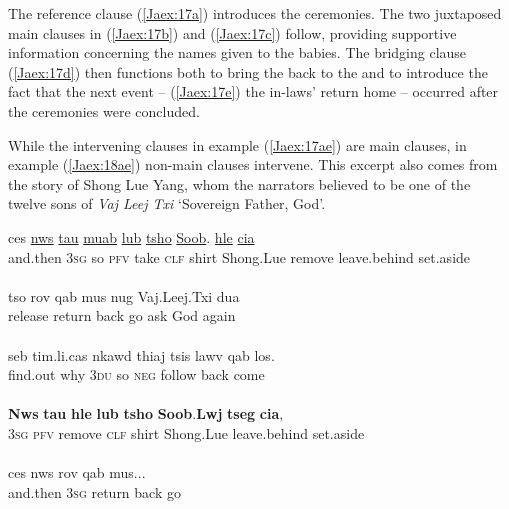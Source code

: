 \documentclass[output=paper]{LSP/langsci}
\begin{document}
\noindent
The reference clause (\ref{Jaex:17a}) introduces the ceremonies. The two juxtaposed main clauses in (\ref{Jaex:17b}) and (\ref{Jaex:17c}) follow, providing supportive information concerning the names given to the babies. The bridging clause (\ref{Jaex:17d}) then functions both to bring the  back to the  and to introduce the fact that the next event – (\ref{Jaex:17e}) the in-laws’ return home – occurred after the ceremonies were concluded.
 
While the intervening clauses in example (\ref{Jaex:17ae}) are main clauses, in example (\ref{Jaex:18ae}) non-main clauses intervene. This excerpt also comes from the story of Shong Lue Yang, whom the narrators believed to be one of the twelve sons of \textit{Vaj Leej Txi } `Sovereign Father, God'.
 
\begin{exe}
\ex \label{Jaex:18ae}
\begin{xlist}
\ex \label{Jaex:18a}
\gll ces \underline{nws} \underline{} \underline{tau} \underline{muab} \underline{lub} \underline{tsho}     \underline{Soob}.\underline{} \underline{hle} \underline{}     \underline{cia}\\
and.then 3\textsc{sg} so  \textsc{pfv} take  \textsc{clf} shirt Shong.Lue remove leave.behind set.aside \\
\glt {}\\
\ex \label{Jaex:18b}
\gll tso rov qab mus nug Vaj.Leej.Txi dua\\
release return back go  ask God again\\ 
\glt {}\\
\ex \label{Jaex:18c}
\gll seb  tim.li.cas  nkawd thiaj tsis lawv  qab los.\\		
find.out why 3\textsc{du} so \textsc{neg} follow back come\\ 
\glt {}\\
\ex \label{Jaex:18d}
\gll \textbf{Nws} \textbf{tau}  \textbf{hle} \textbf{lub} \textbf{tsho} \textbf{Soob}.\textbf{Lwj} \textbf{tseg} \textbf{cia},\\		           
 3\textsc{sg} \textsc{pfv} remove \textsc{clf} shirt Shong.Lue leave.behind set.aside\\
\glt {}\\
\ex \label{Jaex:18e}
\gll ces nws rov qab mus...\\     	      
and.then 3\textsc{sg} return back go\\
\glt {} \citep[][16]{vang90}
\end{xlist}
\end{exe}
\end{document}

